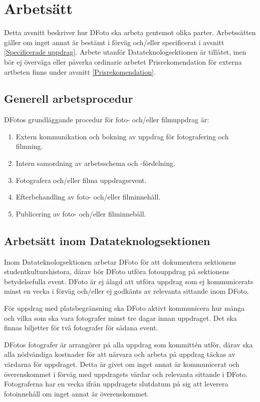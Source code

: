 \section{Arbetsätt}
Detta avsnitt beskriver hur DFoto ska arbeta gentemot olika parter. Arbetssätten gäller om inget annat är bestämt i förväg och/eller specificerat i avsnitt \ref{Specificerade uppdrag}. Arbete utanför Datateknologsektionen är tillåtet, men bör ej överväga eller påverka ordinarie arbetet  Prisrekomendation för externa artbeten finns under avsnitt \ref{Prisrekomendation}.

\subsection{Generell arbetsprocedur} 
DFotos grundläggande procedur för foto- och/eller filmuppdrag är:
\begin{enumerate}
    \item Extern kommunikation och bokning av uppdrag för fotografering och filmning. 
    \item Intern samordning av arbetsschema och -fördelning. 
    \item Fotografera och/eller filma uppdragsevent.
    \item Efterbehandling av foto- och/eller filminnehåll.
    \item Publicering av foto- och/eller filminnebåll. 
\end{enumerate}

\subsection{Arbetsätt inom Datateknologsektionen}
\label{Arbetsätt inom Datateknologsektionen}
Inom Datateknologsektionen arbetar DFoto för att dokumentera sektionens studentkulturshistora, därav bör DFoto utföra fotouppdrag på sektionens betydelsefulla event. 
DFoto är ej ålagd att utföra uppdrag som ej kommunicerats minst en vecka i förväg och/eller ej godkänts av relevanta sittande inom DFoto. 

För uppdrag med platsbegränsning ska DFoto aktivt kommunicera hur många och vilka som ska vara fotografer minst tre dagar innan uppdraget. Det ska finnas biljetter för två fotografer för sådana event. 

DFotos fotografer är arrangörer på alla uppdrag som kommittén utför, därav ska alla nödvändiga kostnader för att närvara och arbeta på uppdrag täckas av värdarna för uppdraget. Detta är givet om inget annat är kommunicerat och överenskommet i förväg med uppdragets värdar och relevanta sittande i DFoto. Fotograferna har en vecka ifrån uppdragets slutdatum på sig att leverera fotoinnehåll om inget annat är överenskommet. 

